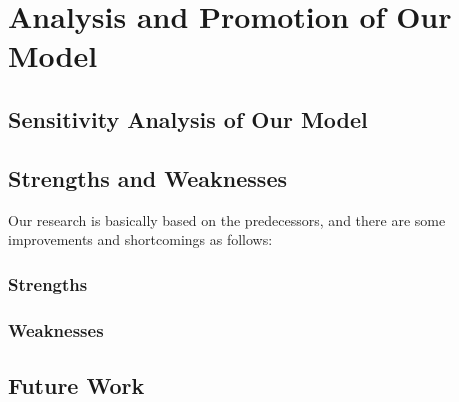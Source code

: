 \documentclass[12pt]{article}  %
\begin{document}
\newpage
\section{Analysis and Promotion of Our Model}
\subsection{Sensitivity Analysis of Our Model}
\subsection{Strengths and Weaknesses}
Our research is basically based on the predecessors, and there are some improvements and shortcomings as follows:
\subsubsection{Strengths}
\subsubsection{Weaknesses}
\subsection{Future Work}























































\end{document}
